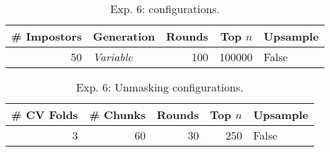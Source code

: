 \begin{table}[h]
\centering\small
\caption{Exp. 6: \impAppr{} configurations.}
\label{tab:av_comp}
\begin{tabular}{@{}rlrrl@{}}   %
\toprule
\# Impostors & Generation & Rounds & Top $n$ & Upsample \\
\midrule
50 & \textit{Variable} & 100 & \num{100000} & False \\
\bottomrule
\end{tabular}%
\end{table}

\begin{table}[h]
\centering\small
\caption{Exp. 6: Unmasking configurations.}
\label{tab:exp6_unmasking_config}
\begin{tabular}{@{}rrrrl@{}}   %
\toprule
\# CV Folds & \# Chunks & Rounds & Top $n$ & Upsample \\
\midrule
3 & 60 & 30 & \num{250} & False \\
\bottomrule
\end{tabular}%
\end{table}